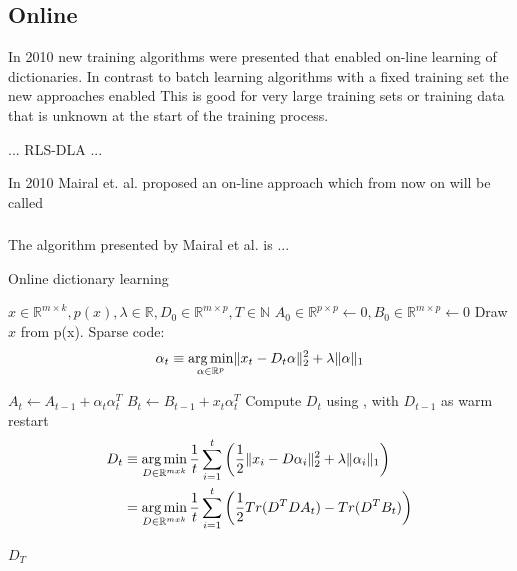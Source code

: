 \subsection{Online}
In 2010 new training algorithms were presented that enabled on-line learning of
dictionaries. In contrast to batch learning algorithms with a fixed training set
the new approaches enabled This is good for very large training sets or training
data that is unknown at the start of the training process.

... RLS-DLA\cite{Engan2010} ...


In 2010 Mairal et. al.\cite{Mairal2010} proposed an on-line approach which from
now on will be called \trainDL

\subsubsection{\trainDL}
\label{sec:mairal}
The algorithm presented by Mairal et al.\cite{Mairal2010} is ...

\begin{algorithm}
\caption{Online dictionary learning\cite{Mairal2010}}
\begin{algorithmic}[1]
\REQUIRE $x \in \mathbb{R}^{m \times k},  p \left( x \right), \lambda \in \mathbb{R}, D_0 \in \mathbb{R}^{m \times p}, T \in \mathbb{N}$
\STATE $A_0 \in \mathbb{R}^{p \times p} \gets  0, B_0 \in \mathbb{R}^{m \times p}\gets 0$
\STATE Draw $x$ from p(x).
\STATE Sparse code:
\begin{align*} 
\alpha_t \equiv \operatorname*{arg\,min}_{\alpha\in\mathbb{R}^{p}}  \lVert x_t - D_t\alpha \rVert^{2}_{2}  +  \lambda \lVert \alpha \rVert_{1}
\end{align*}

\STATE $A_t \gets A_{t-1} + \alpha_t\alpha_t^T$
\STATE $B_t \gets B_{t-1} + x_t\alpha_t^T$
\STATE Compute $D_t$ using , with $D_{t-1}$ as warm restart 
\begin{equation}
\begin{split}
D_t  & \equiv \operatorname*{arg\,min}_{D \in \mathbb{R}^{m x k}}  \frac{1}{t} \sum_{i=1}^t
\left( \frac{1}{2} \lVert x_i - D\alpha_i \rVert^{2}_{2}  +  \lambda \lVert
\alpha_i \rVert_{1} \right) \\
& = \operatorname*{arg\,min}_{D \in \mathbb{R}^{m x k}}  \frac{1}{t} \sum_{i=1}^t
\left( \frac{1}{2} Tr(D^TDA_t) - Tr(D^TB_t)\right) \label{eq:update}
\end{split}
\end{equation}
 
\ENDFOR
\RETURN $D_T$
\end{algorithmic}
\end{algorithm}


